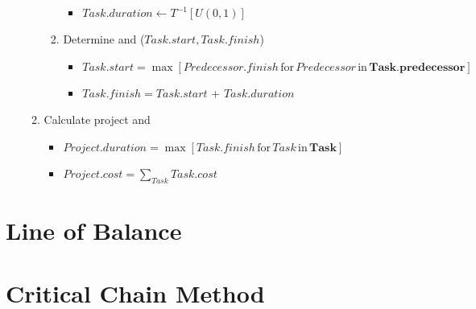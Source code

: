 \documentclass[letterpaper,10pt,english]{jupyterBook}
\begin{document}
\begin{enumerate}
\begin{enumerate}
\begin{enumerate}
\begin{itemize}
\item {} 
\sphinxAtStartPar
\(Task.duration \leftarrow T^{-1}[U(0,1)]\)

\end{itemize}

\item {} 
\sphinxAtStartPar
Determine  and  (\(Task.start, Task.finish\))
\begin{itemize}
\item {} 
\sphinxAtStartPar
\(Task.start = \max \left[ Predecessor.finish \, \text{for} \, Predecessor \, \text{in} \,  \bm{Task.predecessor} \right]\)

\item {} 
\sphinxAtStartPar
\(Task.finish = Task.start\) + \(Task.duration\)

\end{itemize}

\end{enumerate}

\item {} 
\sphinxAtStartPar
Calculate project  and 
\begin{itemize}
\item {} 
\sphinxAtStartPar
\(Project.duration = \max \left[ Task.finish \, \text{for} \, Task \, \text{in} \, \bm{Task} \right]\)

\item {} 
\sphinxAtStartPar
\(Project.cost = \sum_{Task} Task.cost\)

\end{itemize}

\end{enumerate}

\end{enumerate}

\sphinxstepscope


\chapter{Line of Balance}
\label{\detokenize{PM/lob:line-of-balance}}\label{\detokenize{PM/lob::doc}}
\sphinxstepscope


\chapter{Critical Chain Method}
\label{\detokenize{PM/ccm:critical-chain-method}}\label{\detokenize{PM/ccm::doc}}
\sphinxstepscope
\end{document}
